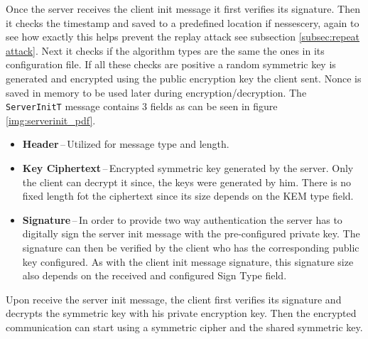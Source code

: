 Once the server receives the client init message it first verifies its signature. Then it checks the timestamp and saved to a predefined location if nessescery, again to see how exactly this helps prevent the replay attack see subsection \ref{subsec:repeat attack}. Next it checks if the algorithm types are the same the ones in its configuration file. If all these checks are positive a random symmetric key is generated and encrypted using the public encryption key the client sent. Nonce is saved in memory to be used later during encryption/decryption. The \texttt{ServerInitT} message contains 3 fields as can be seen in figure \ref{img:serverinit_pdf}.
\begin{itemize}
  \item \textbf{Header}\,--\,Utilized for message type and length.
  \item \textbf{Key Ciphertext}\,--\,Encrypted symmetric key generated by the server. Only the client can decrypt it since, the keys were generated by him. There is no fixed length fot the ciphertext since its size depends on the KEM type field.
  \item \textbf{Signature}\,--\,In order to provide two way authentication the server has to digitally sign the server init message with the pre-configured private key. The signature can then be verified by the client who has the corresponding public key configured. As with the client init message signature, this signature size also depends on the received and configured Sign Type field.
\end{itemize}

Upon receive the server init message, the client first verifies its signature and decrypts the symmetric key with his private encryption key. Then the encrypted communication can start using a symmetric cipher and the shared symmetric key.
